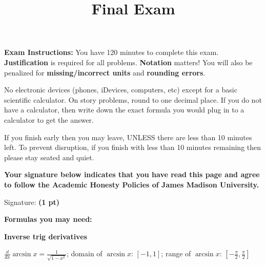 \documentclass[12pt, addpoints]{exam/exam}
\title{\vspace{-8pc}
\vfill{\Huge
	\bf Final Exam %
	} 
	}
\date{}
\newcommand{\1}{^{-1}}
\theoremstyle{plain}
\begin{document}
\begin{coverpages}
\maketitle
\thispagestyle{headandfoot}
\vspace{-4pc}
{\bf Exam Instructions:} You have 120 minutes to complete this exam.  \textbf{Justification} is required for all problems.  \textbf{Notation} matters!  You will also be penalized for \textbf{missing/incorrect units} and \textbf{rounding errors}. 

\vspace{1pc} 
No electronic devices (phones, iDevices, computers, etc) except for a basic scientific calculator.  On story problems, round to one decimal place.  If you do not have a calculator, then write down the exact formula you would plug in to a calculator to get the answer. 

\vspace{1pc}
If you finish early then you may leave, UNLESS there are less than 10 minutes left.  To prevent disruption, if you finish with less than 10 minutes remaining then please stay seated and quiet.

\begin{flushright}

\vspace{0.3in}

\vspace{0.3in}
\end{flushright}

\vfill
\textbf{Your signature below indicates that you have read this page and agree to follow the Academic Honesty Policies of James Madison University.}  

\vspace{0.3in}
Signature: {\bf (1 pt)} \underline{\hspace{73ex}}

\newpage

\textbf{\large Formulas you may need:}

\vspace{1.5pc}
\textbf{Inverse trig derivatives}
\vspace{0.5pc}

$\frac{d}{dx}\arcsin x=\frac{1}{\sqrt{1-x^2}}$; domain of $\arcsin x$: $[-1,1]$; range of $\arcsin x$: $[-\frac{\pi}{2},\frac{\pi}{2}]$


\end{coverpages}
\end{document}
